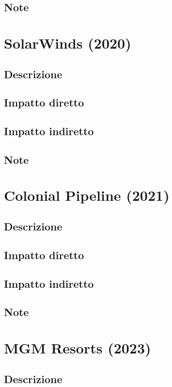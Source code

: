 \documentclass[12pt,a4paper,openright,twoside]{report}
\begin{document}
\subsection{Note}
\section{SolarWinds (2020)}
\subsection{Descrizione}

\subsection{Impatto diretto}

\subsection{Impatto indiretto}

\subsection{Note}
\section{Colonial Pipeline (2021)}
\subsection{Descrizione}

\subsection{Impatto diretto}

\subsection{Impatto indiretto}

\subsection{Note}
\section{MGM Resorts (2023)}
\subsection{Descrizione}
\end{document}
